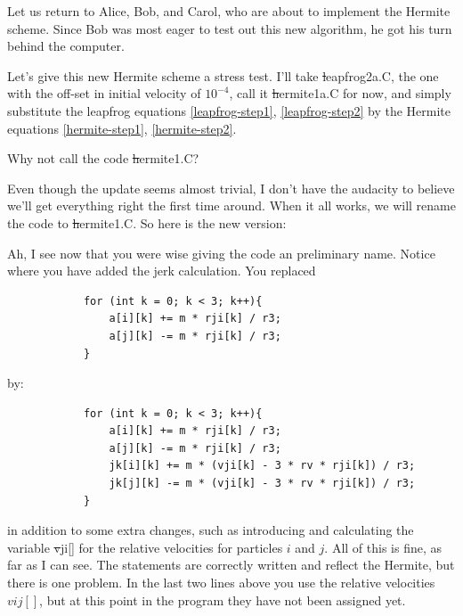 Let us return to Alice, Bob, and Carol, who are about to implement the
Hermite scheme.  Since Bob was most eager to test out this new
algorithm, he got his turn behind the computer.

\abc

\bob
Let's give this new Hermite scheme a stress test.  I'll take {\st
leapfrog2a.C}, the one with the off-set in initial velocity of
$10^{-4}$, call it {\st hermite1a.C} for now, and simply substitute
the leapfrog equations \ref{leapfrog-step1}, \ref{leapfrog-step2} by
the Hermite equations \ref{hermite-step1}, \ref{hermite-step2}.

\carol
Why not call the code {\st hermite1.C}?

\bob
Even though the update seems almost trivial, I don't have the audacity
to believe we'll get everything right the first time around.  When it
all works, we will rename the code to {\st hermite1.C}.  So here is
the new version:

\cba


\abc

\alice
Ah, I see now that you were wise giving the code an preliminary name.
Notice where you have added the jerk calculation.  You replaced

\begin{small}
\begin{verbatim}
            for (int k = 0; k < 3; k++){
                a[i][k] += m * rji[k] / r3;
                a[j][k] -= m * rji[k] / r3;
            }
\end{verbatim}
\end{small}

\noindent
by:

\begin{small}
\begin{verbatim}
            for (int k = 0; k < 3; k++){
                a[i][k] += m * rji[k] / r3;
                a[j][k] -= m * rji[k] / r3;
                jk[i][k] += m * (vji[k] - 3 * rv * rji[k]) / r3;
                jk[j][k] -= m * (vji[k] - 3 * rv * rji[k]) / r3;
            }
\end{verbatim}
\end{small}

\noindent
in addition to some extra changes, such as introducing and calculating
the variable {\st vji[]} for the relative velocities for particles $i$
and $j$.  All of this is fine, as far as I can see.  The statements are
correctly written and reflect the Hermite, but there is one problem.
In the last two lines above you use the relative velocities $vij[]$,
but at this point in the program they have not been assigned yet.

